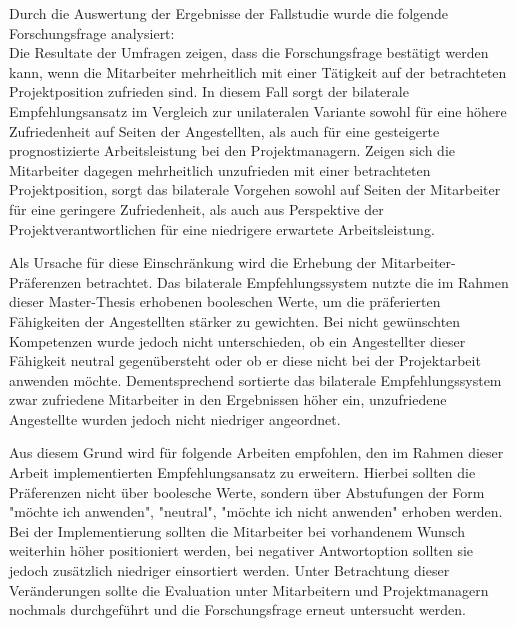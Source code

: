 Durch die Auswertung der Ergebnisse der Fallstudie wurde die folgende Forschungsfrage analysiert: \forschungsfrage\\
Die Resultate der Umfragen zeigen, dass die Forschungsfrage bestätigt werden kann, wenn die Mitarbeiter mehrheitlich mit einer Tätigkeit auf der betrachteten Projektposition zufrieden sind. In diesem Fall sorgt der bilaterale Empfehlungsansatz im Vergleich zur unilateralen Variante sowohl für eine höhere Zufriedenheit auf Seiten der Angestellten, als auch für eine gesteigerte prognostizierte Arbeitsleistung bei den Projektmanagern. Zeigen sich die Mitarbeiter dagegen mehrheitlich unzufrieden mit einer betrachteten Projektposition, sorgt das bilaterale Vorgehen sowohl auf Seiten der Mitarbeiter für eine geringere Zufriedenheit, als auch aus Perspektive der Projektverantwortlichen für eine niedrigere erwartete Arbeitsleistung.

Als Ursache für diese Einschränkung wird die Erhebung der Mitarbeiter-Präferenzen betrachtet. Das bilaterale Empfehlungssystem nutzte die im Rahmen dieser Master-Thesis erhobenen booleschen Werte, um die präferierten Fähigkeiten der Angestellten stärker zu gewichten. Bei nicht gewünschten Kompetenzen wurde jedoch nicht unterschieden, ob ein Angestellter dieser Fähigkeit neutral gegenübersteht oder ob er diese nicht bei der Projektarbeit anwenden möchte. Dementsprechend sortierte das bilaterale Empfehlungssystem zwar zufriedene Mitarbeiter in den Ergebnissen höher ein, unzufriedene Angestellte wurden jedoch nicht niedriger angeordnet.

Aus diesem Grund wird für folgende Arbeiten empfohlen, den im Rahmen dieser Arbeit implementierten Empfehlungsansatz zu erweitern. Hierbei sollten die Präferenzen nicht über boolesche Werte, sondern über Abstufungen der Form "möchte ich anwenden", "neutral", "möchte ich nicht anwenden" erhoben werden. Bei der Implementierung sollten die Mitarbeiter bei vorhandenem Wunsch weiterhin höher positioniert werden, bei negativer Antwortoption sollten sie jedoch zusätzlich niedriger einsortiert werden. Unter Betrachtung dieser Veränderungen sollte die Evaluation unter Mitarbeitern und Projektmanagern nochmals durchgeführt und die Forschungsfrage erneut untersucht werden.

